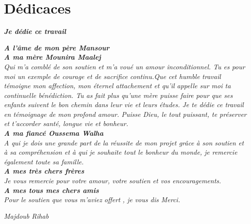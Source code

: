 \section*{Dédicaces}
\vspace{1.0in}

\begin{center}
\textit{\textsl{ \textbf{Je dédie ce travail} } }
\end{center}
\begin{center}
\textsl{
 \textbf{A l'âme de mon père Mansour}
 \\[0.2in]
 \textbf{A ma mère Mounira Maalej}\\ 
 Qui m'a comblé de son soutien et m'a 
voué un amour inconditionnel. Tu es pour moi un exemple de
courage et de sacrifice continu.Que cet humble travail témoigne
mon affection, mon éternel attachement et qu'il appelle sur moi
ta continuelle bénédiction. Tu as fait plus qu’une mère puisse faire pour que ses 
enfants suivent le bon chemin dans leur vie et leurs études. 
Je te dédie ce travail en témoignage de mon profond 
amour. Puisse Dieu, le tout puissant, te préserver et 
t’accorder santé, longue vie et bonheur.
\\[0.2in]
\textbf{A ma fiancé Oussema Walha}\\
A qui je dois une grande part de la réussite de mon projet grâce à
son soutien et à sa compréhension et à qui je souhaite tout le bonheur du monde,
je remercie également toute sa famille.
\\[0.2in]
\textbf{A mes très chers frères}\\
Je vous remercie pour votre amour, 
votre soutien et vos encouragements. 
\\[0.2in]
\textbf{A mes tous mes chers amis}\\
Pour le soutien que vous m'aviez
offert , je vous dis Merci.}
\begin{flushright}
 \textit{\emph {Majdoub Rihab}}
\end{flushright}

\end{center}



